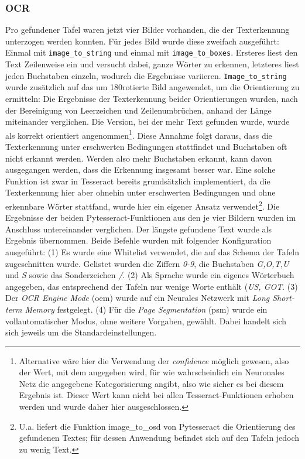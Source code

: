\subsubsection{OCR}

Pro gefundener Tafel waren jetzt vier Bilder vorhanden, die der Texterkennung unterzogen werden konnten. Für jedes Bild wurde diese zweifach ausgeführt: Einmal mit \verb|image_to_string| und einmal mit \verb|image_to_boxes|. Ersteres liest den Text Zeilenweise ein und versucht dabei, ganze Wörter zu erkennen, letzteres liest jeden Buchstaben einzeln, wodurch die Ergebnisse variieren. \verb|Image_to_string| wurde zusätzlich auf das um 180\degree rotierte Bild angewendet, um die Orientierung zu ermitteln: Die Ergebnisse der Texterkennung beider Orientierungen wurden, nach der Bereinigung von Leerzeichen und Zeilenumbrüchen, anhand der Länge miteinander verglichen. Die Version, bei der mehr Text gefunden wurde, wurde als korrekt orientiert angenommen\footnote{Alternative wäre hier die Verwendung der \textit{confidence} möglich gewesen, also der Wert, mit dem angegeben wird, für wie wahrscheinlich ein Neuronales Netz die angegebene Kategorisierung angibt, also wie sicher es bei diesem Ergebnis ist. Dieser Wert kann nicht bei allen Tesseract-Funktionen erhoben werden und wurde daher hier ausgeschlossen.}. Diese Annahme folgt daraus, dass die Texterkennung unter erschwerten Bedingungen stattfindet und Buchstaben oft nicht erkannt werden. Werden also mehr Buchstaben erkannt, kann davon ausgegangen werden, dass die Erkennung insgesamt besser war. Eine solche Funktion ist zwar in Tesseract bereits grundsätzlich implementiert, da die Texterkennung hier aber ohnehin unter erschwerten Bedingungen und ohne erkennbare Wörter stattfand, wurde hier ein eigener Ansatz verwendet\footnote{U.a. liefert die Funktion image\_to\_osd von Pytesseract die Orientierung des gefundenen Textes; für dessen Anwendung befindet sich auf den Tafeln jedoch zu wenig Text.}.
Die Ergebnisse der beiden Pytesseract-Funktionen aus den je vier Bildern wurden im Anschluss untereinander verglichen. Der längste gefundene Text wurde als Ergebnis übernommen.
Beide Befehle wurden mit folgender Konfiguration ausgeführt: (1) Es wurde eine Whitelist verwendet, die auf das Schema der Tafeln zugeschnitten wurde. Gelistet wurden die Ziffern \textit{0-9}, die Buchstaben \textit{G,O,T,U} und \textit{S} sowie das Sonderzeichen \textit{/}. (2) Als Sprache wurde ein eigenes Wörterbuch angegeben, das entsprechend der Tafeln nur wenige Worte enthält (\textit{US, GOT}. (3) Der \textit{OCR Engine Mode} (oem) wurde auf ein Neurales Netzwerk mit \textit{Long Short-term Memory}\cite{hochreitersepp} festgelegt. (4) Für die \textit{Page Segmentation} (psm) wurde ein vollautomatischer Modus, ohne weitere Vorgaben, gewählt. Dabei handelt sich sich jeweils um die Standardeinstellungen.

